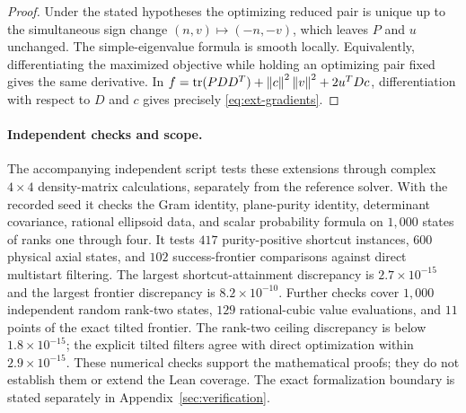 \begin{proof}
Under the stated hypotheses the optimizing reduced pair is unique up
to the simultaneous sign change $(n,v)\mapsto(-n,-v)$, which leaves
$P$ and $u$ unchanged. The simple-eigenvalue formula is smooth locally.
Equivalently, differentiating the maximized objective while holding
an optimizing pair fixed gives the same derivative.
In
$f=\operatorname{tr}(PDD^T)+\left\lVert c\right\rVert^2\left\lVert v\right\rVert^2+2u^TDc$,
differentiation with respect to $D$ and $c$ gives precisely
\eqref{eq:ext-gradients}.
\end{proof}

\paragraph{Independent checks and scope.}
The accompanying independent script tests these extensions through
complex $4\times4$ density-matrix calculations, separately from the
reference solver. With the recorded seed it checks the Gram identity,
plane-purity identity, determinant covariance, rational ellipsoid data,
and scalar probability formula on $1{,}000$ states of ranks one through
four. It tests $417$ purity-positive shortcut instances, $600$ physical
axial states, and $102$ success-frontier comparisons against direct
multistart filtering. The largest shortcut-attainment discrepancy is
$2.7\times10^{-15}$ and the largest frontier discrepancy is
$8.2\times10^{-10}$.
Further checks cover $1{,}000$ independent random rank-two states,
$129$ rational-cubic value evaluations, and $11$ points of the exact
tilted frontier. The rank-two ceiling discrepancy is below
$1.8\times10^{-15}$; the explicit tilted filters agree with direct
optimization within $2.9\times10^{-15}$.
These numerical checks support the mathematical
proofs; they do not establish them or extend the Lean coverage.
The exact formalization boundary is stated separately in
Appendix~\ref{sec:verification}.

